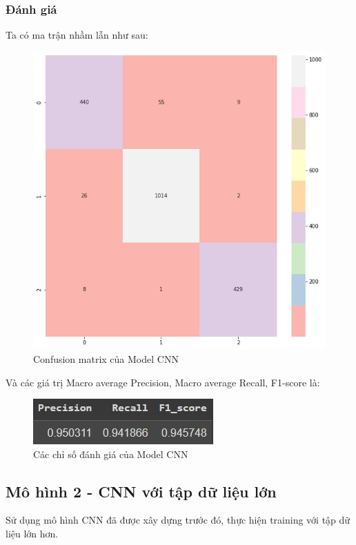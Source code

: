 \subsubsection{Đánh giá}
Ta có ma trận nhầm lẫn như sau:
\begin{center}
    \begin{figure}[!h]
        \centering
        \includegraphics[scale = 0.4]{fileanh/18.png}
        \caption{Confusion matrix của Model CNN}
    \end{figure}
\end{center}
Và các giá trị Macro average Precision, Macro average Recall, F1-score là:
\begin{center}
    \begin{figure}[!h]
        \centering
        \includegraphics[scale = 1.6]{fileanh/19.jpg}
        \caption{Các chỉ số đánh giá của Model CNN}
    \end{figure}
\end{center}


\subsection{Mô hình 2 - CNN với tập dữ liệu lớn}
Sử dụng mô hình CNN đã được xây dựng trước đó, thực hiện training với tập dữ liệu lớn hơn.

